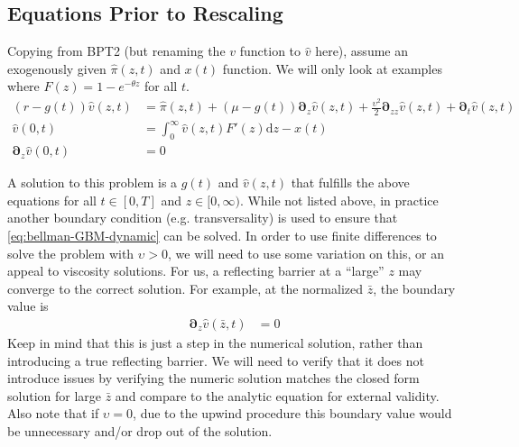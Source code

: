 \documentclass[11pt]{article}
\newcommand{\D}[1][]{\ensuremath{\boldsymbol{\partial}_{#1}}}
\newcommand{\diff}{\ensuremath{\mathrm{d}}}
\begin{document}
\subsection{Equations Prior to Rescaling}

Copying from BPT2 (but renaming the $v$ function to $\hat{v}$ here), assume an exogenously given $\hat{\pi}(z,t)$ and $x(t)$ function.  We will only look at examples where $F(z) = 1 - e^{-\theta z}$ for all $t$.
\begin{align}
(r - g(t)) \hat{v}(z,t) &= \hat{\pi}(z,t) + (\mu- g(t)) \D[z] \hat{v}(z,t) + \tfrac{\upsilon^2}{2} \D[zz] \hat{v}(z,t) + \D[t]\hat{v}(z,t)\label{eq:bellman-GBM-dynamic}	\\
\hat{v}(0,t) &= \int_{0}^{\infty} \hat{v}(z,t) F'(z)\diff z - x(t)\label{eq:vm-GBM-dynamic}\\
\D[z]\hat{v}(0,t) &= 0\label{eq:sp-GBM-dynamic}
\end{align}

A solution to this problem is a $g(t)$ and $\hat{v}(z,t)$ that fulfills the above equations for all $t\in[0,T]$ and $z\in[0,\infty)$.  While not listed above, in practice another boundary condition (e.g. transversality) is used to ensure that \cref{eq:bellman-GBM-dynamic} can be solved.  In order to use finite differences to solve the problem with $\upsilon > 0$, we will need to use some variation on this, or an appeal to viscosity solutions.  For us, a reflecting barrier at a ``large'' $z$ may converge to the correct solution.  For example, at the normalized $\bar{z}$, the boundary value is
	\begin{align}
	\D[z]\hat{v}(\bar{z},t) &= 0\label{eq:reflecting-GBM-dynamic}
	\end{align}
	Keep in mind that this is just a step in the numerical solution, rather than introducing a true reflecting barrier.  We will need to verify that it does not introduce issues by verifying the numeric solution matches the closed form solution for large $\bar{z}$ and compare to the analytic equation for external validity.  Also note that if $\upsilon = 0$, due to the upwind procedure this boundary value would be unnecessary and/or drop out of the solution.
\end{document}
